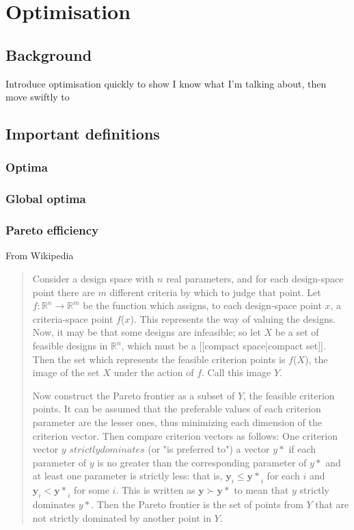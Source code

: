 \chapter{Optimisation}

\section{Background}
Introduce optimisation quickly to show I know what I'm talking about, then move swiftly to 

\section{Important definitions}

\subsection{Optima}
\subsection{Global optima}
\subsection{Pareto efficiency}

From Wikipedia
\begin{quote}
  Consider a design space with $n$ real parameters, and for each
  design-space point there are $m$ different criteria by which to
  judge that point. Let $f : \mathbb{R}^n \rightarrow \mathbb{R}^m$ be
  the function which assigns, to each design-space point $x$, a
  criteria-space point $f$($x$). This represents the way of valuing
  the designs. Now, it may be that some designs are infeasible; so let
  $X$ be a set of feasible designs in ${\mathbb{R}}^n$, which must be
  a [[compact space|compact set]]. Then the set which represents the
  feasible criterion points is $f$($X$), the image of the set $X$
  under the action of $f$. Call this image $Y$.

  Now construct the Pareto frontier as a subset of $Y$, the feasible
  criterion points. It can be assumed that the preferable values of
  each criterion parameter are the lesser ones, thus minimizing each
  dimension of the criterion vector. Then compare criterion vectors as
  follows: One criterion vector $y$ $strictly dominates$ (or "is
  preferred to") a vector $y*$ if each parameter of $y$ is no greater
  than the corresponding parameter of $y*$ and at least one parameter
  is strictly less: that is, $\mathbf{y}_i \le \mathbf{y*}_i$ for each
  $i$ and $\mathbf{y}_i < \mathbf{y*}_i$ for some $i$. This is written
  as $\mathbf{y} \succ \mathbf{y*}$ to mean that $y$ strictly
  dominates $y*$. Then the Pareto frontier is the set of points from
  $Y$ that are not strictly dominated by another point in $Y$.
\end{quote}

